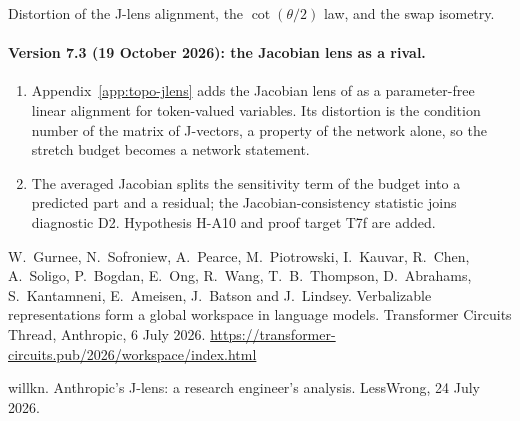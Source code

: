 \item[\texttt{topo\_jlens\_check.py}, \texttt{.json}] Distortion of the
J-lens alignment, the $\cot(\theta/2)$ law, and the swap isometry.

\paragraph{Version 7.3 (19 October 2026): the Jacobian lens as a rival.}
\begin{enumerate}[leftmargin=*]
\item Appendix~\ref{app:topo-jlens} adds the Jacobian lens of
\cite{gurnee2026workspace} as a parameter-free linear alignment for
token-valued variables. Its distortion is the condition number of the
matrix of J-vectors, a property of the network alone, so the stretch budget
becomes a network statement.
\item The averaged Jacobian splits the sensitivity term of the budget into a
predicted part and a residual; the Jacobian-consistency statistic joins
diagnostic D2. Hypothesis H-A10 and proof target T7f are added.
\end{enumerate}

 W.~Gurnee, N.~Sofroniew, A.~Pearce,
M.~Piotrowski, I.~Kauvar, R.~Chen, A.~Soligo, P.~Bogdan, E.~Ong, R.~Wang,
T.~B.~Thompson, D.~Abrahams, S.~Kantamneni, E.~Ameisen, J.~Batson and
J.~Lindsey. Verbalizable representations form a global workspace in language
models. Transformer Circuits Thread, Anthropic, 6 July 2026.
\url{https://transformer-circuits.pub/2026/workspace/index.html}

\unv{} willkn. Anthropic's J-lens: a research
engineer's analysis. LessWrong, 24 July 2026.
